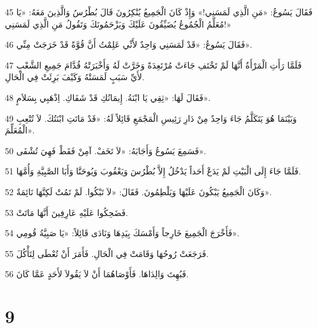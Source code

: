 \par 45 فَقَالَ يَسُوعُ: «مَنِ الَّذِي لَمَسَنِي!» وَإِذْ كَانَ الْجَمِيعُ يُنْكِرُونَ قَالَ بُطْرُسُ وَالَّذِينَ مَعَهُ: «يَا مُعَلِّمُ الْجُمُوعُ يُضَيِّقُونَ عَلَيْكَ وَيَزْحَمُونَكَ وَتَقُولُ مَنِ الَّذِي لَمَسَنِي!»
\par 46 فَقَالَ يَسُوعُ: «قَدْ لَمَسَنِي وَاحِدٌ لأَنِّي عَلِمْتُ أَنَّ قُوَّةً قَدْ خَرَجَتْ مِنِّي».
\par 47 فَلَمَّا رَأَتِ الْمَرْأَةُ أَنَّهَا لَمْ تَخْتَفِ جَاءَتْ مُرْتَعِدَةً وَخَرَّتْ لَهُ وَأَخْبَرَتْهُ قُدَّامَ جَمِيعِ الشَّعْبِ لأَيِّ سَبَبٍ لَمَسَتْهُ وَكَيْفَ بَرِئَتْ فِي الْحَالِ.
\par 48 فَقَالَ لَهَا: «ثِقِي يَا ابْنَةُ. إِيمَانُكِ قَدْ شَفَاكِ. اِذْهَبِي بِسَلاَمٍ».
\par 49 وَبَيْنَمَا هُوَ يَتَكَلَّمُ جَاءَ وَاحِدٌ مِنْ دَارِ رَئِيسِ الْمَجْمَعِ قَائِلاً لَهُ: «قَدْ مَاتَتِ ابْنَتُكَ. لاَ تُتْعِبِ الْمُعَلِّمَ».
\par 50 فَسَمِعَ يَسُوعُ وَأَجَابَهُ: «لاَ تَخَفْ. آمِنْ فَقَطْ فَهِيَ تُشْفَى».
\par 51 فَلَمَّا جَاءَ إِلَى الْبَيْتِ لَمْ يَدَعْ أَحَداً يَدْخُلُ إِلاَّ بُطْرُسَ وَيَعْقُوبَ وَيُوحَنَّا وَأَبَا الصَّبِيَّةِ وَأُمَّهَا.
\par 52 وَكَانَ الْجَمِيعُ يَبْكُونَ عَلَيْهَا وَيَلْطِمُونَ. فَقَالَ: «لاَ تَبْكُوا. لَمْ تَمُتْ لَكِنَّهَا نَائِمَةٌ».
\par 53 فَضَحِكُوا عَلَيْهِ عَارِفِينَ أَنَّهَا مَاتَتْ.
\par 54 فَأَخْرَجَ الْجَمِيعَ خَارِجاً وَأَمْسَكَ بِيَدِهَا وَنَادَى قَائِلاً: «يَا صَبِيَّةُ قُومِي».
\par 55 فَرَجَعَتْ رُوحُهَا وَقَامَتْ فِي الْحَالِ. فَأَمَرَ أَنْ تُعْطَى لِتَأْكُلَ.
\par 56 فَبُهِتَ وَالِدَاهَا. فَأَوْصَاهُمَا أَنْ لاَ يَقُولاَ لأَحَدٍ عَمَّا كَانَ.

\chapter{9}

